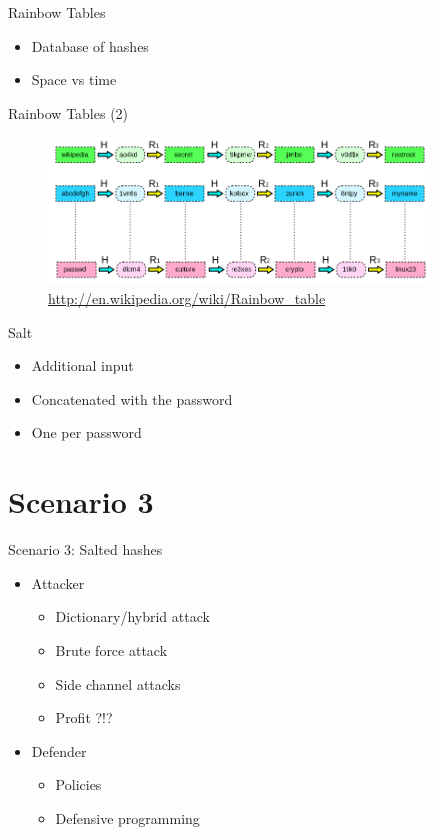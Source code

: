 \documentclass{curs}
\begin{document}
\begin{frame}{Rainbow Tables}
  \begin{itemize}
    \item Database of hashes
    \item Space vs time
  \end{itemize}
\end{frame}

\begin{frame}{Rainbow Tables (2)}
  \begin{figure}
    \centering
    \includegraphics[width=0.9\textwidth]{img/rainbow-table.png} \\
    \tiny{\url{http://en.wikipedia.org/wiki/Rainbow_table}}
  \end{figure}
\end{frame}

\begin{frame}{Salt}
  \begin{itemize}
    \item Additional input
    \item Concatenated with the password
    \item One per password
  \end{itemize}
\end{frame}

\section {Scenario 3}

\begin{frame}{Scenario 3: Salted hashes}
  \begin{itemize}
    \item Attacker
      \begin{itemize}
        \item Dictionary/hybrid attack
        \item Brute force attack
        \item Side channel attacks
        \item Profit ?!?
      \end{itemize}
    \item Defender \begin{itemize}
      \item Policies
      \item Defensive programming
    \end{itemize}
  \end{itemize}
\end{frame}
\end{document}
